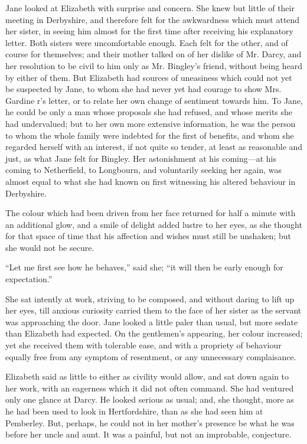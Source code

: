 \documentclass[10pt]{book}
\begin{document}
   Jane looked at Elizabeth with surprise and concern. She knew but little
of their meeting in Derbyshire, and therefore felt for the awkwardness
which must attend her sister, in seeing him almost for the first time
after receiving his explanatory letter. Both sisters were uncomfortable
enough. Each felt for the other, and of course for themselves; and their
mother talked on of her dislike of Mr. Darcy, and her resolution to be
civil to him only as Mr. Bingley’s friend, without being heard by either
of them. But Elizabeth had sources of uneasiness which could not yet be
suspected by Jane, to whom she had never yet had courage to show Mrs.
Gardine
   r’s letter, or to relate her own change of sentiment towards
him. To Jane, he could be only a man whose proposals she had refused,
and whose merits she had undervalued; but to her own more extensive
information, he was the person to whom the whole family were indebted
for the first of benefits, and whom she regarded herself with an
interest, if not quite so tender, at least as reasonable and just, as
what Jane felt for Bingley. Her astonishment at his coming—at his
coming to Netherfield, to Longbourn, and voluntarily seeking her again,
was almost equal to what she had known on first witnessing his altered
behaviour in Derbyshire.
  

   The colour which had been driven from her face returned for half a
minute with an additional glow, and a smile of delight added lustre to
her eyes, as she thought for that space of time that his affection and
wishes must still be unshaken; but she would not be secure.
  

   “Let me first see how he behaves,” said she; “it will then be early
enough for expectation.”
  

   She sat intently at work, striving to be composed, and without daring to
lift up her eyes, till anxious curiosity carried them to the face of her
sister as the servant was approaching the door. Jane looked a little
paler than usual, but more sedate than Elizabeth had expected. On the
gentlemen’s appearing, her colour increased; yet she received them with
tolerable ease, and with a propriety of behaviour equally free from any
symptom of resentment, or any unnecessary complaisance.
  

   Elizabeth said as little to either as civility would allow, and sat down
again to her work, with an eagerness which it did not often command. She
had ventured only one glance at Darcy. He looked serious as usual;
   and,
she thought, more as he had been used to look in Hertfordshire, than as
she had seen him at Pemberley. But, perhaps, he could not in her
mother’s presence be what he was before her uncle and aunt. It was a
painful, but not an improbable, conjecture.
  
\end{document}
